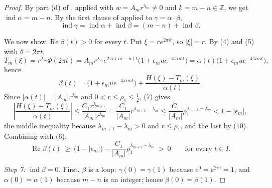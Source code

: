 \begin{proof}
By part (d) of , applied with $w=A_mr^{\lambda_m}\neq0$
and $k=m-n\in\mathbb{Z}$, we get $\operatorname{ind}\alpha=m-n$.  By the first
clause of  applied to $\gamma=\alpha\cdot\beta$,
\begin{equation}\tag{11}
  \operatorname{ind}\gamma=\operatorname{ind}\alpha+\operatorname{ind}\beta
  =(m-n)+\operatorname{ind}\beta .
\end{equation}

We now show $\operatorname{Re}\beta(t)>0$ for every $t$.  Put
$\xi=re^{2\pi it}$, so $|\xi|=r$.  By (4) and (5) with $\theta=2\pi t$,
\[
  T_m(\xi)=r^{\lambda_m}\Phi(2\pi t)
  =A_mr^{\lambda_m}e^{2\pi i(m-n)t}\bigl(1+\epsilon_m u e^{-4\pi imt}\bigr)
  =\alpha(t)\bigl(1+\epsilon_m u e^{-4\pi imt}\bigr),
\]
hence
\[
  \beta(t)=\bigl(1+\epsilon_m u e^{-4\pi imt}\bigr)
    +\frac{H(\xi)-T_m(\xi)}{\alpha(t)} .
\]
Since $|\alpha(t)|=|A_m|r^{\lambda_m}$ and $0<r\le\rho_1\le\tfrac12$, (7) gives
\[
  \left|\frac{H(\xi)-T_m(\xi)}{\alpha(t)}\right|
  \le\frac{C_1r^{\lambda_{m+1}}}{|A_m|r^{\lambda_m}}
  =\frac{C_1}{|A_m|}r^{\lambda_{m+1}-\lambda_m}
  \le\frac{C_1}{|A_m|}\rho_1^{\lambda_{m+1}-\lambda_m}<1-|\epsilon_m|,
\]
the middle inequality because $\lambda_{m+1}-\lambda_m>0$ and $r\le\rho_1$, and
the last by (10).  Combining with (6),
\begin{equation}\tag{12}
  \operatorname{Re}\beta(t)
  \ \ge\ \bigl(1-|\epsilon_m|\bigr)
    -\frac{C_1}{|A_m|}\rho_1^{\lambda_{m+1}-\lambda_m}\ >\ 0
  \qquad\text{for every }t\in I .
\end{equation}

\emph{Step 7: $\operatorname{ind}\beta=0$.}  First, $\beta$ is a loop:
$\gamma(0)=\gamma(1)$ because $e^{0}=e^{2\pi i}=1$, and
$\alpha(0)=\alpha(1)$ because $m-n$ is an integer; hence $\beta(0)=\beta(1)$.


\end{proof}
